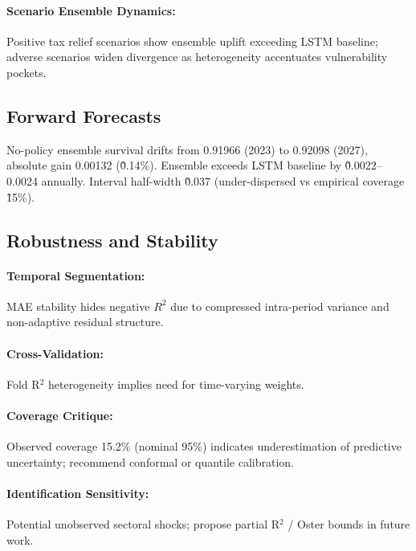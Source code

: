 \paragraph{Scenario Ensemble Dynamics:} Positive tax relief scenarios show ensemble uplift exceeding LSTM baseline; adverse scenarios widen divergence as heterogeneity accentuates vulnerability pockets.

\subsection{Forward Forecasts}
No-policy ensemble survival drifts from 0.91966 (2023) to 0.92098 (2027), absolute gain 0.00132 (\~0.14\%). Ensemble exceeds LSTM baseline by \~0.0022--0.0024 annually. Interval half-width \~0.037 (under-dispersed vs empirical coverage \~15\%).

\subsection{Robustness and Stability}
\paragraph{Temporal Segmentation:} MAE stability hides negative $R^2$ due to compressed intra-period variance and non-adaptive residual structure.
\paragraph{Cross-Validation:} Fold R$^2$ heterogeneity implies need for time-varying weights.
\paragraph{Coverage Critique:} Observed coverage 15.2\% (nominal 95\%) indicates underestimation of predictive uncertainty; recommend conformal or quantile calibration.
\paragraph{Identification Sensitivity:} Potential unobserved sectoral shocks; propose partial R$^2$ / Oster bounds in future work.

